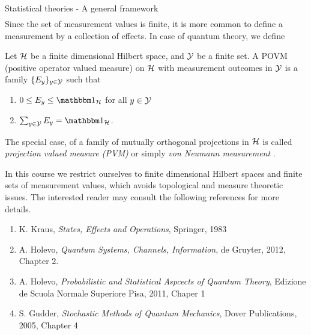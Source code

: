 \begin{section}{Statistical theories - A general framework}
\begin{align}
   \end{align}
	Since the set of measurement values is finite, it is more common to define a measurement by a collection of effects. In case of quantum theory, we define
   \begin{definition}
   	 Let ${\mathcal H}$ be a finite dimensional Hilbert space, and ${\mathcal Y}$ be a finite set. A POVM (positive operator valued measure) on ${\mathcal H}$ with measurement outcomes in ${\mathcal Y}$ is a family $\{E_y\}_{y \in {\mathcal Y}}$ such that 
   	 \begin{enumerate}
   	 	\item $0 \leq E_y \leq \bbmeins_\cH$ for all $y \in {\mathcal Y}$
   	 	\item $\sum_{y \in \cY} E_y = \bbmeins_\cH$. 
   	 \end{enumerate}
   	 The special case, of a family of mutually orthogonal projections in ${\mathcal H}$ is called \emph{projection valued measure (PVM)} or simply   \emph{von Neumann measurement} .
   \end{definition}
	In this course we restrict ourselves to finite dimensional Hilbert spaces and finite sets of measurement values, which avoids topological and measure theoretic issues. The interested reader may consult the following references for more details. 
\begin{enumerate}
 \item K. Kraus, \emph{States, Effects and Operations}, Springer, 1983
 \item A. Holevo, \emph{Quantum Systems, Channels, Information}, de Gruyter, 2012, Chapter 2.
 \item A. Holevo, \emph{Probabilistic and Statistical Aspcects of Quantum Theory}, Edizione de Scuola Normale Superiore Pisa, 2011, Chaper 1
 \item S. Gudder, \emph{Stochastic Methods of Quantum Mechanics}, Dover Publications, 2005, Chapter 4
 \end{enumerate}
\end{section}

